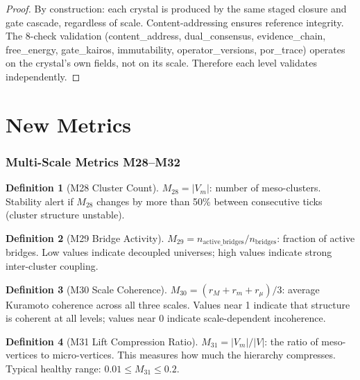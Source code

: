 \documentclass[11pt,a4paper,twoside]{article}
\theoremstyle{definition}
\newtheorem{definition}{Definition}[section]
\theoremstyle{plain}
\theoremstyle{remark}
\begin{document}
\begin{proof}
By construction: each crystal is produced by the same staged closure
and gate cascade, regardless of scale. Content-addressing ensures
reference integrity. The 8-check validation (content\_address,
dual\_consensus, evidence\_chain, free\_energy, gate\_kairos,
immutability, operator\_versions, por\_trace) operates on the crystal's
own fields, not on its scale. Therefore each level validates
independently.
\end{proof}


\part{New Metrics}\label{part:metrics}

\section{Multi-Scale Metrics M28--M32}\label{sec:newmetrics}

\begin{definition}[M28 Cluster Count]\label{def:m28}
$M_{28} = |V_m|$: number of meso-clusters. Stability alert if
$M_{28}$ changes by more than 50\% between consecutive ticks
(cluster structure unstable).
\end{definition}

\begin{definition}[M29 Bridge Activity]\label{def:m29}
$M_{29} = n_{\mathrm{active\_bridges}} / n_{\mathrm{bridges}}$:
fraction of active bridges. Low values indicate decoupled universes;
high values indicate strong inter-cluster coupling.
\end{definition}

\begin{definition}[M30 Scale Coherence]\label{def:m30}
$M_{30} = (r_M + r_m + r_\mu) / 3$: average Kuramoto coherence across
all three scales. Values near 1 indicate that structure is coherent at
all levels; values near 0 indicate scale-dependent incoherence.
\end{definition}

\begin{definition}[M31 Lift Compression Ratio]\label{def:m31}
$M_{31} = |V_m| / |V|$: the ratio of meso-vertices to micro-vertices.
This measures how much the hierarchy compresses. Typical healthy range:
$0.01 \le M_{31} \le 0.2$.
\end{definition}
\end{document}
